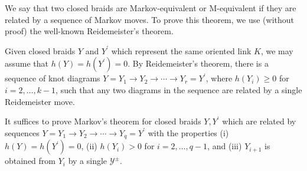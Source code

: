 We say that two closed braids are Markov-equivalent or M-equivalent if they are related by a sequence of Markov moves. To prove this theorem, we use (without proof) the well-known Reidemeister's theorem.

Given closed braids $Y$ and $Y^{\prime}$ which represent the same oriented link $K$, we may assume that $h(Y) = h(Y^{\prime}) = 0$. By Reidemeister's theorem, there is a sequence of knot diagrams $Y = Y_1 \to Y_2 \to \cdots \to Y_r = Y^{\prime}$, where $h(Y_i) \geq 0$ for $i = 2,\ldots,k-1$, such that any two diagrams in the sequence are related by a single Reidemeister move.

\begin{lemma}
It suffices to prove Markov's theorem for closed braids $Y, Y^{\prime}$ which are related by sequences $Y = Y_1 \to Y_2 \to \cdots \to Y_q = Y^{\prime}$ with the properties (i) $h(Y) = h(Y^{\prime}) = 0$, (ii) $h(Y_i) > 0$ for $i = 2, \ldots, q-1$, and (iii) $Y_{i+1}$ is obtained from $Y_i$ by a single $\mathcal{Y}^{\pm}$.
\end{lemma}
